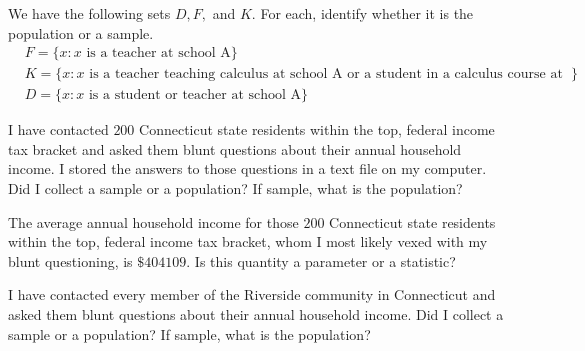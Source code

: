 \begin{exercise}
We have the following sets $D, F,$ and $K$. For each, identify whether it is the population or a sample.
\begin{align*}
    &F = \{x: x \hspace{4pt} \text{is a teacher at school A}\}\\
    &K = \{x: x \hspace{4pt} \text{is a teacher teaching calculus at school A or a student in a calculus course at school A}\}\\
    &D = \{x: x \hspace{4pt} \text{is a student or teacher at school A}\}
\end{align*}
\end{exercise}

\begin{exercise}
I have contacted $200$ Connecticut state residents within the top, federal income tax bracket and asked them blunt questions about their annual household income. I stored the answers to those questions in a text file on my computer. Did I collect a sample or a population? If sample, what is the population? 
\end{exercise}

\begin{exercise}
The average annual household income for those $200$ Connecticut state residents within the top, federal income tax bracket, whom I most likely vexed with my blunt questioning, is $\$404109$. Is this quantity a parameter or a statistic?
\end{exercise}

\begin{exercise}
I have contacted every member of the Riverside community in Connecticut and asked them blunt questions about their annual household income. Did I collect a sample or a population? If sample, what is the population? 
\end{exercise}